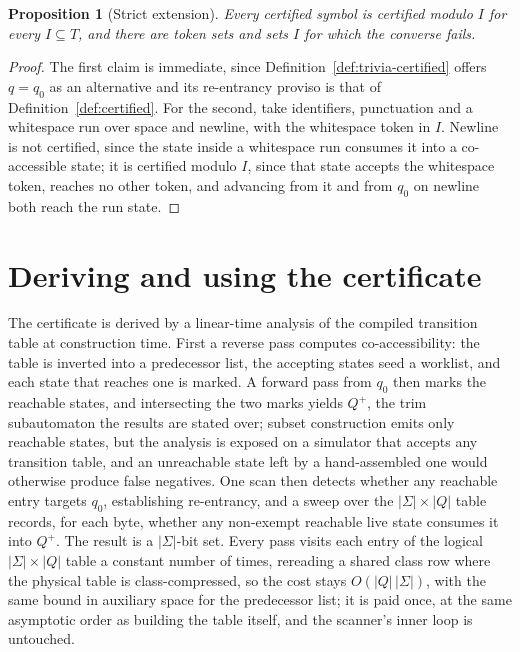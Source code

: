 \documentclass[11pt,a4paper]{article}
\theoremstyle{definition}
\theoremstyle{plain}
\newtheorem{proposition}{Proposition}
\begin{document}
\begin{proposition}[Strict extension]
\label{prop:extends}
Every certified symbol is certified modulo $I$ for every $I \subseteq T$, and there are token sets and sets $I$ for
which the converse fails.
\end{proposition}

\begin{proof}
The first claim is immediate, since Definition~\ref{def:trivia-certified} offers $q = q_0$ as an alternative and its
re-entrancy proviso is that of Definition~\ref{def:certified}. For the second, take identifiers, punctuation and a
whitespace run over space and newline, with the whitespace token in $I$. Newline is not certified, since the state
inside a whitespace run consumes it into a co-accessible state; it is certified modulo $I$, since that state accepts
the whitespace token, reaches no other token, and advancing from it and from $q_0$ on newline both reach the run
state.
\end{proof}

\section{Deriving and using the certificate}
\label{sec:derivation}

The certificate is derived by a linear-time analysis of the compiled transition table at construction time. First a
reverse pass computes co-accessibility: the table is inverted into a predecessor list, the accepting states seed a
worklist, and each state that reaches one is marked. A forward pass from $q_0$ then marks the reachable states, and
intersecting the two marks yields $Q^+$, the trim subautomaton the results are stated over; subset construction emits
only reachable states, but the analysis is exposed on a simulator that accepts any transition table, and an unreachable
state left by a hand-assembled one would otherwise produce false negatives. One scan then detects whether any reachable
entry targets $q_0$, establishing re-entrancy, and a sweep over the $|\Sigma| \times |Q|$ table records, for each byte,
whether any non-exempt reachable live state consumes it into $Q^+$. The result is a $|\Sigma|$-bit set. Every pass
visits each entry of the logical $|\Sigma| \times |Q|$ table a constant number of times, rereading a shared class
row where the physical table is class-compressed, so the cost stays $O(|Q|\,|\Sigma|)$, with the same bound in
auxiliary space for the predecessor list; it is paid once, at the same asymptotic order as building the table itself,
and the scanner's inner loop is untouched.
\end{document}
